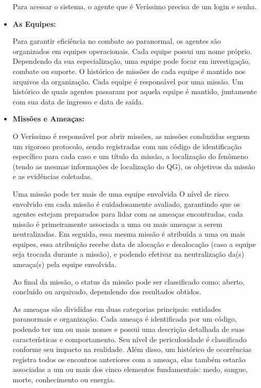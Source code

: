 \documentclass[12pt,a4paper]{report}
\begin{document}
\begin{itemize}
    Para acessar o sistema, o agente que é Veríssimo precisa de um login e senha.
    
    \item \textbf {As Equipes:}
    
    Para garantir eficiência no combate ao paranormal, os agentes são organizados em equipes operacionais. Cada equipe possui um nome próprio. Dependendo da sua especialização, uma equipe pode focar em investigação, combate ou suporte. O histórico de missões de cada equipe é mantido nos arquivos da organização.
    Cada equipe é responsável por uma missão. Um histórico de quais agentes passaram por aquela equipe é mantido, juntamente com sua data de ingresso e data de saída.

    
    \item \textbf {Missões e Ameaças:}
    
    O Veríssimo é responsável por abrir missões, as missões conduzidas seguem um rigoroso protocolo, sendo registradas com um código de identificação específico para cada caso e um título da missão, a localização do fenômeno (tendo as mesmas informações de localização do QG), os objetivos da missão e as evidências coletadas.
    
    Uma missão pode ter mais de uma equipe envolvida O nível de risco envolvido em cada missão é cuidadosamente avaliado, garantindo que os agentes estejam preparados para lidar com as ameaças encontradas, cada missão é primeiramente associada a uma ou mais ameaças a serem neutralizadas. Em seguida, essa mesma missão é atribuída a uma ou mais equipes, essa atribuição recebe data de alocação e desalocação (caso a equipe seja trocada durante a missão), e podendo efetivar na neutralização da(s) ameaça(s) pela equipe envolvida.
    
    Ao final da missão, o status da missão pode ser classificado como: aberto, concluído ou arquivado, dependendo dos resultados obtidos.
    
    As ameaças são divididas em duas categorias principais: entidades paranormais e organização. Cada ameaça é identificada por um código, podendo ter um ou mais nomes e possui uma descrição detalhada de suas características e comportamento. Seu nível de periculosidade é classificado conforme seu impacto na realidade. Além disso, um histórico de ocorrências registra todos os encontros anteriores com a ameaça, elas também estarão associadas a um ou mais dos cinco elementos fundamentais: medo, sangue, morte, conhecimento ou energia. 
    

\end{itemize}
\end{document}
